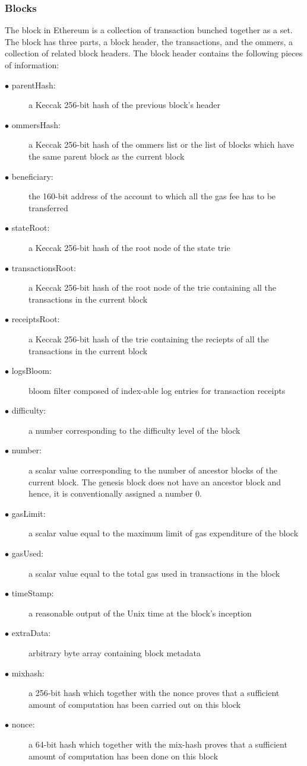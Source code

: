 \documentclass[a4paper,twoside,phd]{BYUPhys}
\begin{document}
\subsubsection{Blocks}
The block in Ethereum is a collection of transaction bunched together as a set. The block has three parts, a block header, the transactions, and the ommers, a collection of related block headers. The block header contains the following pieces of information:
\begin{description}
\item[$\bullet$ parentHash:] a Keccak 256-bit hash of the previous block's header
\item[$\bullet$ ommersHash:] a Keccak 256-bit hash of the ommers list or the list of blocks which have the same parent block as the current block
\item[$\bullet$ beneficiary:] the 160-bit address of the account to which all the gas fee has to be transferred
\item[$\bullet$ stateRoot:] a Keccak 256-bit hash of the root node of the state trie
\item[$\bullet$ transactionsRoot:] a Keccak 256-bit hash of the root node of the trie containing all the transactions in the current block
\item[$\bullet$ receiptsRoot:] a Keccak 256-bit hash of the trie containing the reciepts of all the transactions in the current block
\item[$\bullet$ logsBloom:] bloom filter composed of index-able log entries for transaction receipts
\item[$\bullet$ difficulty:] a number corresponding to the difficulty level of the block
\item[$\bullet$ number:] a scalar value corresponding to the number of ancestor blocks of the current block. The genesis block does not have an ancestor block and hence, it is conventionally assigned a number 0.
\item[$\bullet$ gasLimit:] a scalar value equal to the maximum limit of gas expenditure of the block
\item[$\bullet$ gasUsed:] a scalar value equal to the total gas used in transactions in the block
\item[$\bullet$ timeStamp:] a reasonable output of the Unix time at the block's inception
\item[$\bullet$ extraData:] arbitrary byte array containing block metadata
\item[$\bullet$ mixhash:] a 256-bit hash which together with the nonce proves that a sufficient amount of computation has been carried out on this block
\item[$\bullet$ nonce:] a 64-bit hash which together with the mix-hash proves that a sufficient amount of computation has been done on this block
\end{description}
\end{document}
